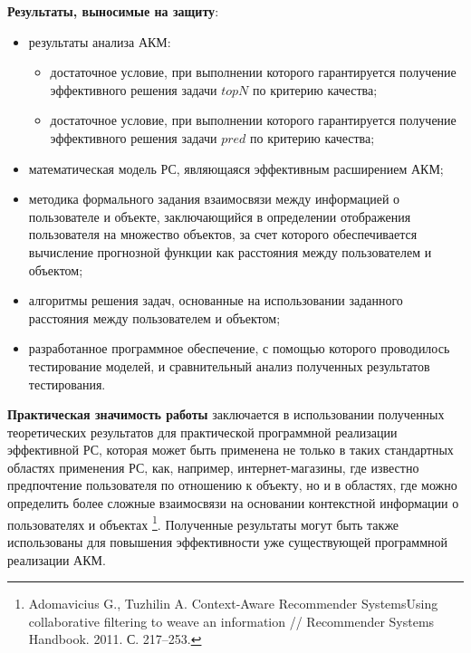 {\bf Результаты, выносимые на защиту}:
\begin{itemize}
\item результаты анализа АКМ:
  \begin{itemize}
	\item достаточное условие, при выполнении которого гарантируется получение
		эффективного решения задачи $topN$ по критерию качества;
	\item достаточное условие, при выполнении которого гарантируется получение
		эффективного решения задачи $pred$ по критерию качества;
  \end{itemize}
\item математическая модель РС, являющаяся эффективным расширением АКМ;
\item методика формального задания взаимосвязи между информацией
	о пользователе и объекте,
	заключающийся в определении отображения пользователя на множество объектов,
	за счет которого обеспечивается вычисление прогнозной функции как
	расстояния между пользователем и объектом;
\item алгоритмы решения задач, основанные на использовании заданного
	расстояния между пользователем и объектом;
\item разработанное программное обеспечение, с помощью которого проводилось
	тестирование моделей, и сравнительный анализ полученных
	результатов тестирования.
\end{itemize}


{\bf Практическая значимость работы} заключается в использовании
полученных теоретических результатов для практической программной реализации
эффективной РС, которая может быть применена не только в таких стандартных
областях применения РС, как, например, интернет-магазины,
где известно предпочтение пользователя по отношению к объекту, но и
в областях, где можно определить более сложные взаимосвязи на основании
контекстной информации о пользователях и объектах \footnote{Adomavicius G., Tuzhilin A. Context-Aware Recommender SystemsUsing
collaborative filtering to weave an information // Recommender Systems
Handbook. 2011. С. 217–253.}.
Полученные результаты могут быть также использованы для повышения
эффективности уже существующей программной реализации АКМ.

